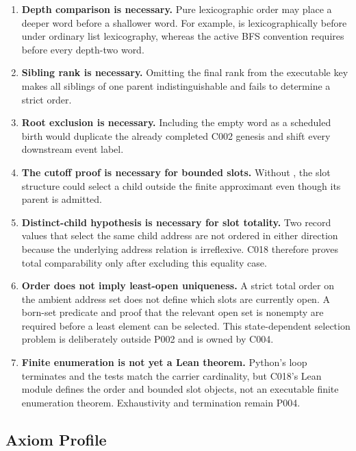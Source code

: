 \begin{enumerate}
\def\labelenumi{\arabic{enumi}.}
\tightlist
\item
  \textbf{Depth comparison is necessary.} Pure lexicographic order may
  place a deeper word before a shallower word. For example,
  \texttt{\protect{}} is lexicographically before \texttt{\protect{}} under ordinary
  list lexicography, whereas the active BFS convention requires
  \texttt{\protect{}} before every depth-two word.
\item
  \textbf{Sibling rank is necessary.} Omitting the final rank from the
  executable key makes all siblings of one parent indistinguishable and
  fails to determine a strict order.
\item
  \textbf{Root exclusion is necessary.} Including the empty word as a
  scheduled birth would duplicate the already completed C002 genesis and
  shift every downstream event label.
\item
  \textbf{The cutoff proof is necessary for bounded slots.} Without
  \texttt{\protect{}}, the slot
  structure could select a child outside the finite approximant even
  though its parent is admitted.
\item
  \textbf{Distinct-child hypothesis is necessary for slot totality.} Two
  record values that select the same child address are not ordered in
  either direction because the underlying address relation is
  irreflexive. C018 therefore proves total comparability only after
  excluding this equality case.
\item
  \textbf{Order does not imply least-open uniqueness.} A strict total
  order on the ambient address set does not define which slots are
  currently open. A born-set predicate and proof that the relevant open
  set is nonempty are required before a least element can be selected.
  This state-dependent selection problem is deliberately outside P002
  and is owned by C004.
\item
  \textbf{Finite enumeration is not yet a Lean theorem.} Python's loop
  terminates and the tests match the carrier cardinality, but C018's
  Lean module defines the order and bounded slot objects, not an
  executable finite enumeration theorem. Exhaustivity and termination
  remain P004.
\end{enumerate}

\subsection{Axiom Profile}\label{axiom-profile}

